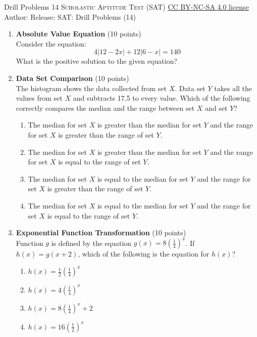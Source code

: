 \newpage\handout
{Drill Problems 14}
{\textsc{Scholastic Aptitude Test (SAT)}}
{\href{https://creativecommons.org/licenses/by-nc-sa/4.0/}{CC BY-NC-SA 4.0 license}}
{Author: \BookAuthor}{Release: \generatedOn}
{SAT: Drill Problems (14)}



\begin{enumerate}  
  \item \textbf{Absolute Value Equation} (10 points)\\
  Consider the equation:
  \[
    4|12-2 x|+12|6-x|=140
  \]
  What is the positive solution to the given equation?
  \begin{subanswer}
  \end{subanswer}



  \item \textbf{Data Set Comparison} (10 points)\\
  The histogram shows the data collected from set $X$. Data set $Y$ takes all the values from set $X$ and subtracts 17.5 to every value. Which of the following correctly compares the median and the range between set $X$ and set $Y$?
  \begin{enumerate}[label=(\Alph*)]
    \item The median for set $X$ is greater than the median for set $Y$ and the range for set $X$ is greater than the range of set $Y$.
    \item The median for set $X$ is greater than the median for set $Y$ and the range for set $X$ is equal to the range of set $Y$.
    \item The median for set $X$ is equal to the median for set $Y$ and the range for set $X$ is greater than the range of set $Y$.
    \item The median for set $X$ is equal to the median for set $Y$ and the range for set $X$ is equal to the range of set $Y$.
  \end{enumerate}
  \begin{subanswer}
  \end{subanswer}

  \newpage

  \item \textbf{Exponential Function Transformation} (10 points)\\
  Function $g$ is defined by the equation $g(x)=8\left(\frac{1}{4}\right)^x$. If $h(x)=g(x+2)$, which of the following is the equation for $h(x)$?
  \begin{enumerate}[label=(\Alph*)]
    \item $h(x)=\frac{1}{2}\left(\frac{1}{4}\right)^x$
    \item $h(x)=4\left(\frac{1}{4}\right)^x$
    \item $h(x)=8\left(\frac{1}{4}\right)^x+2$
    \item $h(x)=16\left(\frac{1}{2}\right)^x$
  \end{enumerate}
  \begin{subanswer}
  \end{subanswer}


\end{enumerate}
